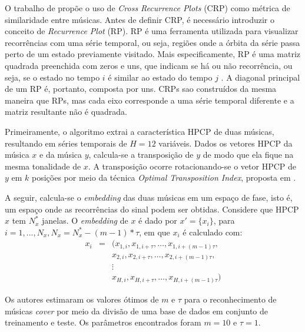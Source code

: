O trabalho de  propõe o uso de \textit{Cross Recurrence Plots} (CRP) como métrica de similaridade entre músicas. Antes de definir CRP, é necessário introduzir o conceito de \textit{Recurrence Plot} (RP). RP é uma ferramenta utilizada para visualizar recorrências com uma série temporal, ou seja, regiões onde a órbita da série passa perto de um estado previamente visitado. Mais especificamente, RP é uma matriz quadrada preenchida com zeros e uns, que indicam se há ou não recorrência, ou seja, se o estado no tempo \({i}\) é similar ao estado do tempo \({j}\) \cite{eckmann1987, alligood1996}. A diagonal principal de um RP é, portanto, composta por uns. CRPs sao construídos da mesma maneira que RPs, mas cada eixo corresponde a uma série temporal diferente e a matriz resultante não é quadrada.

Primeiramente, o algoritmo extrai a característica HPCP \cite{gomez2006} de duas músicas, resultando em séries temporais de \({H = 12}\) variáveis. Dados os vetores HPCP da música \textbf{\({x}\)} e da música \textbf{\({y}\)}, calcula-se a transposição de \textbf{\({y}\)} de modo que ela fique na mesma tonalidade de \textbf{\({x}\)}. A transposição ocorre rotacionando-se o vetor HPCP de \textbf{\({y}\)} em \({k}\) posições por meio da técnica \textit{Optimal Transposition Index}, proposta em \cite{serra2009}.

A seguir, calcula-se o \textit{embedding} das duas músicas em um espaço de fase, isto é, um espaço onde as recorrências do sinal podem ser obtidas. Considere que  HPCP \textbf{\({x}\)} tem \({N_{x}^{*}}\) janelas. O \textit{embedding} de \textbf{\({x}\)} é dado por \({x' = \big\{x_{i}\big\}}\), para \({i = 1, ..., N_{x}, N_{x} = N_{x}^{*} - (m - 1)*\tau}\), em que \({x_{i}}\) é calculado com:
\begin{eqnarray} \label{embedding}
    x_{i} &=& (x_{1,i},x_{1,i+\tau}, \ldots, x_{1,i+(m-1)\tau}, \\
          & & x_{2,i},x_{2,i+\tau}, \ldots, x_{2,i+(m-1)\tau}, \nonumber \\
          & & \vdots \nonumber \\
          & & x_{H,i},x_{H,i+\tau}, \ldots, x_{H,i+(m-1)\tau}) \nonumber
\end{eqnarray}

Os autores estimaram os valores ótimos de \({m}\) e \({\tau}\) para o reconhecimento de músicas \textit{cover} por meio da divisão de uma base de dados em conjunto de treinamento e teste. Os parâmetros encontrados foram \({m = 10}\) e \({\tau = 1}\).

